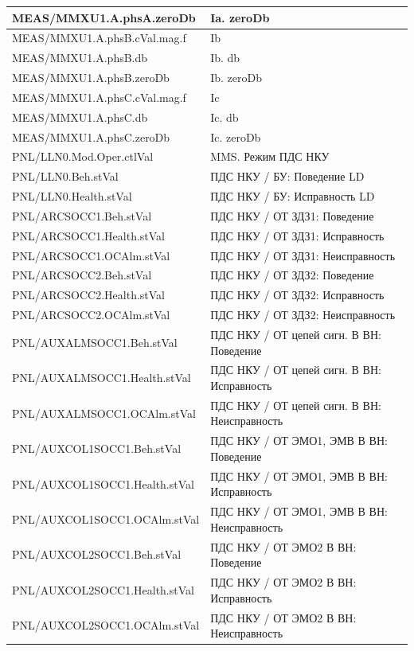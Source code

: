 \begin{longtable}{|>{\raggedright\arraybackslash}m{}|>{\raggedright\arraybackslash}m{}|}
\hline
MEAS/MMXU1.A.phsA.zeroDb & Ia. zeroDb \\
\hline
MEAS/MMXU1.A.phsB.cVal.mag.f & Ib \\
\hline
MEAS/MMXU1.A.phsB.db & Ib. db \\
\hline
MEAS/MMXU1.A.phsB.zeroDb & Ib. zeroDb \\
\hline
MEAS/MMXU1.A.phsC.cVal.mag.f & Ic \\
\hline
MEAS/MMXU1.A.phsC.db & Ic. db \\
\hline
MEAS/MMXU1.A.phsC.zeroDb & Ic. zeroDb \\
\hline
PNL/LLN0.Mod.Oper.ctlVal & MMS. Режим ПДС НКУ \\
\hline
PNL/LLN0.Beh.stVal & ПДС НКУ / БУ: Поведение LD \\
\hline
PNL/LLN0.Health.stVal & ПДС НКУ / БУ: Исправность LD \\
\hline
PNL/ARCSOCC1.Beh.stVal & ПДС НКУ / ОТ ЗДЗ1: Поведение \\
\hline
PNL/ARCSOCC1.Health.stVal & ПДС НКУ / ОТ ЗДЗ1: Исправность \\
\hline
PNL/ARCSOCC1.OCAlm.stVal & ПДС НКУ / ОТ ЗДЗ1: Неисправность \\
\hline
PNL/ARCSOCC2.Beh.stVal & ПДС НКУ / ОТ ЗДЗ2: Поведение \\
\hline
PNL/ARCSOCC2.Health.stVal & ПДС НКУ / ОТ ЗДЗ2: Исправность \\
\hline
PNL/ARCSOCC2.OCAlm.stVal & ПДС НКУ / ОТ ЗДЗ2: Неисправность \\
\hline
PNL/AUXALMSOCC1.Beh.stVal & ПДС НКУ / ОТ цепей сигн. В ВН: Поведение \\
\hline
PNL/AUXALMSOCC1.Health.stVal & ПДС НКУ / ОТ цепей сигн. В ВН: Исправность \\
\hline
PNL/AUXALMSOCC1.OCAlm.stVal & ПДС НКУ / ОТ цепей сигн. В ВН: Неисправность \\
\hline
PNL/AUXCOL1SOCC1.Beh.stVal & ПДС НКУ / ОТ ЭМО1, ЭМВ В ВН: Поведение \\
\hline
PNL/AUXCOL1SOCC1.Health.stVal & ПДС НКУ / ОТ ЭМО1, ЭМВ В ВН: Исправность \\
\hline
PNL/AUXCOL1SOCC1.OCAlm.stVal & ПДС НКУ / ОТ ЭМО1, ЭМВ В ВН: Неисправность \\
\hline
PNL/AUXCOL2SOCC1.Beh.stVal & ПДС НКУ / ОТ ЭМО2 В ВН: Поведение \\
\hline
PNL/AUXCOL2SOCC1.Health.stVal & ПДС НКУ / ОТ ЭМО2 В ВН: Исправность \\
\hline
PNL/AUXCOL2SOCC1.OCAlm.stVal & ПДС НКУ / ОТ ЭМО2 В ВН: Неисправность \\

\end{longtable}
